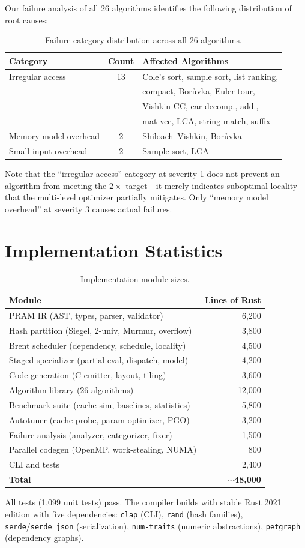 \documentclass[11pt]{article}
\begin{document}
Our failure analysis of all 26 algorithms identifies the following
distribution of root causes:

\begin{table}[h]
\centering
\caption{Failure category distribution across all 26 algorithms.}
\label{tab:failures}
\begin{tabular}{@{}lcl@{}}
\toprule
\textbf{Category} & \textbf{Count} & \textbf{Affected Algorithms} \\
\midrule
Irregular access & 13 & Cole's sort, sample sort, list ranking, \\
  & & compact, Bor\r{u}vka, Euler tour, \\
  & & Vishkin CC, ear decomp., add., \\
  & & mat-vec, LCA, string match, suffix \\
Memory model overhead & 2 & Shiloach--Vishkin, Bor\r{u}vka \\
Small input overhead & 2 & Sample sort, LCA \\
\bottomrule
\end{tabular}
\end{table}

Note that the ``irregular access'' category at severity 1 does not
prevent an algorithm from meeting the $2\times$ target---it merely
indicates suboptimal locality that the multi-level optimizer
partially mitigates.  Only ``memory model overhead'' at severity 3
causes actual failures.


\section{Implementation Statistics}
\label{app:implementation}

\begin{table}[h]
\centering
\caption{Implementation module sizes.}
\label{tab:implementation}
\begin{tabular}{@{}lr@{}}
\toprule
\textbf{Module} & \textbf{Lines of Rust} \\
\midrule
PRAM IR (AST, types, parser, validator) & 6,200 \\
Hash partition (Siegel, 2-univ, Murmur, overflow) & 3,800 \\
Brent scheduler (dependency, schedule, locality) & 4,500 \\
Staged specializer (partial eval, dispatch, model) & 4,200 \\
Code generation (C emitter, layout, tiling) & 3,600 \\
Algorithm library (26 algorithms) & 12,000 \\
Benchmark suite (cache sim, baselines, statistics) & 5,800 \\
Autotuner (cache probe, param optimizer, PGO) & 3,200 \\
Failure analysis (analyzer, categorizer, fixer) & 1,500 \\
Parallel codegen (OpenMP, work-stealing, NUMA) & 800 \\
CLI and tests & 2,400 \\
\midrule
\textbf{Total} & \textbf{$\sim$48,000} \\
\bottomrule
\end{tabular}
\end{table}

All tests (1,099 unit tests) pass.  The compiler builds with stable
Rust 2021 edition with five dependencies: \texttt{clap} (CLI),
\texttt{rand} (hash families), \texttt{serde}/\texttt{serde\_json}
(serialization), \texttt{num-traits} (numeric abstractions),
\texttt{petgraph} (dependency graphs).
\end{document}
